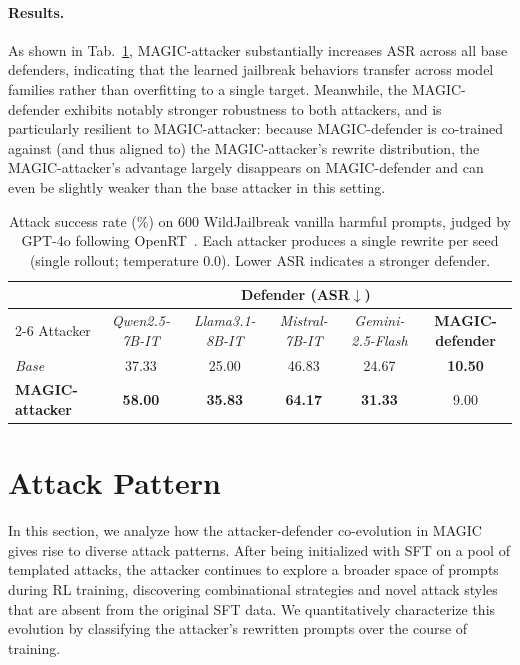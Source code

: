 \documentclass[11pt, letterpaper]{template}
\theoremstyle{plain}
\theoremstyle{definition}
\theoremstyle{remark}
\begin{document}
\paragraph{Results.} As shown in Tab.~\ref{tab:wildjailbreak_transferability}, MAGIC-attacker substantially increases ASR across all base defenders, indicating that the learned jailbreak behaviors transfer across model families rather than overfitting to a single target. Meanwhile, the MAGIC-defender exhibits notably stronger robustness to both attackers, and is particularly resilient to MAGIC-attacker: because MAGIC-defender is co-trained against (and thus aligned to) the MAGIC-attacker's rewrite distribution, the MAGIC-attacker's advantage largely disappears on MAGIC-defender and can even be slightly weaker than the base attacker in this setting.

\begin{table}[ht]
\centering
\caption{Attack success rate (\%) on 600 WildJailbreak vanilla harmful prompts, judged by GPT-4o following OpenRT~\citep{OpenRT2026}. Each attacker produces a single rewrite per seed (single rollout; temperature $0.0$). Lower ASR indicates a stronger defender.}
\label{tab:wildjailbreak_transferability}
\setlength{\tabcolsep}{3pt}
\renewcommand{\arraystretch}{1.12}
\scriptsize
\begin{tabular}{lccccc}
\toprule
& \multicolumn{5}{c}{Defender (ASR$\downarrow$)} \\
\cmidrule(lr){2-6}
Attacker & \textit{Qwen2.5-7B-IT} & \textit{Llama3.1-8B-IT} & \textit{Mistral-7B-IT} & \textit{Gemini-2.5-Flash} & \textbf{MAGIC-defender} \\
\midrule
\textit{Base} & 37.33 & 25.00 & 46.83 & 24.67 & \textbf{10.50} \\
\textbf{MAGIC-attacker} & \textbf{58.00} & \textbf{35.83} & \textbf{64.17} & \textbf{31.33} & 9.00 \\
\bottomrule
\end{tabular}
\vspace{-1.0em}
\end{table}


\section{Attack Pattern}\label{apd:AttackPattern}
In this section, we analyze how the attacker-defender co-evolution in MAGIC gives rise to diverse attack patterns. After being initialized with SFT on a pool of templated attacks, the attacker continues to explore a broader space of prompts during RL training, discovering combinational strategies and novel attack styles that are absent from the original SFT data. We quantitatively characterize this evolution by classifying the attacker's rewritten prompts over the course of training.
\end{document}
